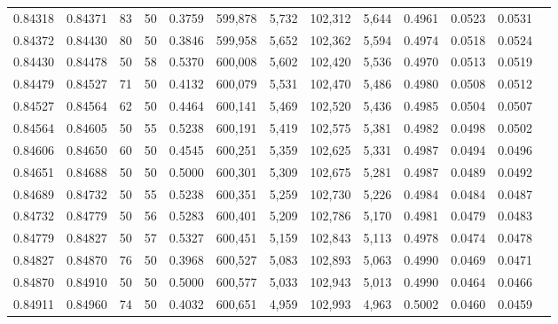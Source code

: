 \begin{tabular}{rrrrrrrrrrrrr}
0.84318 & 0.84371 &    83 &  50 &                                     0.3759 & 599,878 &   5,732 & 102,312 &   5,644 & 0.4961 & 0.0523 & 0.0531 \\
0.84372 & 0.84430 &    80 &  50 &                                     0.3846 & 599,958 &   5,652 & 102,362 &   5,594 & 0.4974 & 0.0518 & 0.0524 \\
0.84430 & 0.84478 &    50 &  58 &                                     0.5370 & 600,008 &   5,602 & 102,420 &   5,536 & 0.4970 & 0.0513 & 0.0519 \\
0.84479 & 0.84527 &    71 &  50 &                                     0.4132 & 600,079 &   5,531 & 102,470 &   5,486 & 0.4980 & 0.0508 & 0.0512 \\
0.84527 & 0.84564 &    62 &  50 &                                     0.4464 & 600,141 &   5,469 & 102,520 &   5,436 & 0.4985 & 0.0504 & 0.0507 \\
0.84564 & 0.84605 &    50 &  55 &                                     0.5238 & 600,191 &   5,419 & 102,575 &   5,381 & 0.4982 & 0.0498 & 0.0502 \\
0.84606 & 0.84650 &    60 &  50 &                                     0.4545 & 600,251 &   5,359 & 102,625 &   5,331 & 0.4987 & 0.0494 & 0.0496 \\
0.84651 & 0.84688 &    50 &  50 &                                     0.5000 & 600,301 &   5,309 & 102,675 &   5,281 & 0.4987 & 0.0489 & 0.0492 \\
0.84689 & 0.84732 &    50 &  55 &                                     0.5238 & 600,351 &   5,259 & 102,730 &   5,226 & 0.4984 & 0.0484 & 0.0487 \\
0.84732 & 0.84779 &    50 &  56 &                                     0.5283 & 600,401 &   5,209 & 102,786 &   5,170 & 0.4981 & 0.0479 & 0.0483 \\
0.84779 & 0.84827 &    50 &  57 &                                     0.5327 & 600,451 &   5,159 & 102,843 &   5,113 & 0.4978 & 0.0474 & 0.0478 \\
0.84827 & 0.84870 &    76 &  50 &                                     0.3968 & 600,527 &   5,083 & 102,893 &   5,063 & 0.4990 & 0.0469 & 0.0471 \\
0.84870 & 0.84910 &    50 &  50 &                                     0.5000 & 600,577 &   5,033 & 102,943 &   5,013 & 0.4990 & 0.0464 & 0.0466 \\
0.84911 & 0.84960 &    74 &  50 &                                     0.4032 & 600,651 &   4,959 & 102,993 &   4,963 & 0.5002 & 0.0460 & 0.0459 \\

\end{tabular}
